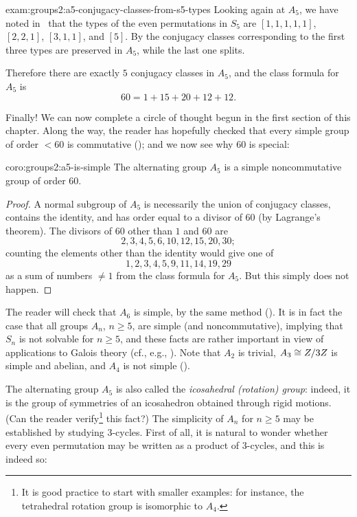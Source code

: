 \begin{exam}{}{exam:groups2:a5-conjugacy-classes-from-s5-types}
  Looking again at $A_5$, we have noted
  in~
  that the types of the even permutations in $S_5$ are $[1,1,1,1,1]$,
  $[2,2,1]$, $[3,1,1]$, and $[5]$.  By
   the conjugacy classes
  corresponding to the first three types are preserved in $A_5$, while
  the last one splits.

  Therefore there are exactly $5$ conjugacy classes in $A_5$, and the
  class formula for $A_5$ is
  \[
    60 = 1 + 15 + 20 + 12 + 12.
  \]
\end{exam}
Finally! We can now complete a circle of thought begun in the first
section of this chapter. Along the way, the reader has hopefully
checked that every simple group of order $< 60$ is commutative
(); and we now
see why $60$ is special:

\begin{coro}{}{coro:groups2:a5-is-simple}
  The alternating group $A_5$ is a simple noncommutative group of
  order $60$.
\end{coro}

\begin{proof}
  A normal subgroup of $A_5$ is necessarily the union of conjugacy
  classes, contains the identity, and has order equal to a divisor of
  $60$ (by Lagrange's theorem). The divisors of $60$ other than $1$
  and $60$ are
  \[
    2, 3, 4, 5, 6, 10, 12, 15, 20, 30;
  \]
  counting the elements other than the identity would give one of
  \[
    1, 2, 3, 4, 5, 9, 11, 14, 19, 29
  \]
  as a sum of numbers $\neq 1$ from the class formula for $A_5$. But
  this simply does not happen.
\end{proof}
The reader will check that $A_6$ is simple, by the same method
(). It is in
fact the case that all groups $A_n$, $n \geq 5$, are simple (and
noncommutative), implying that $S_n$ is not solvable for $n \geq 5$,
and these facts are rather important in view of applications to Galois
theory (cf., e.g., ). Note that $A_2$ is
trivial, $A_3 \cong Z/3Z$ is simple and abelian, and $A_4$ is not
simple ().

The alternating group $A_5$ is also called the \emph{icosahedral
  (rotation) group}: indeed, it is the group of symmetries of an
icosahedron obtained through rigid motions. (Can the reader
verify\footnote{It is good practice to start with smaller examples:
  for instance, the tetrahedral rotation group is isomorphic to
  $A_4$.} this fact?)  The simplicity of $A_n$ for $n \geq 5$ may be
established by studying $3$-cycles. First of all, it is natural to
wonder whether every even permutation may be written as a product of
$3$-cycles, and this is indeed so:

